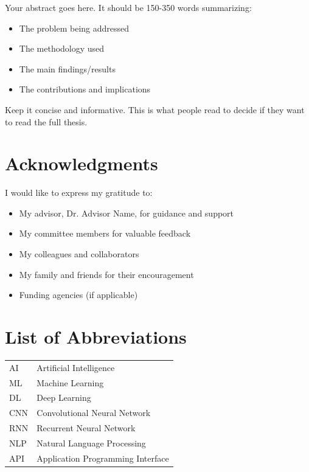 \documentclass[12pt,oneside]{book}
\theoremstyle{plain}
\theoremstyle{definition}
\begin{document}
\vspace{1cm}

\begin{singlespace}
Your abstract goes here. It should be 150-350 words summarizing:
\begin{itemize}
  \item The problem being addressed
  \item The methodology used
  \item The main findings/results
  \item The contributions and implications
\end{itemize}
Keep it concise and informative. This is what people read to decide if they want to read the full thesis.
\end{singlespace}

\clearpage

\chapter*{Acknowledgments}

I would like to express my gratitude to:

\begin{itemize}
  \item My advisor, Dr. Advisor Name, for guidance and support
  \item My committee members for valuable feedback
  \item My colleagues and collaborators
  \item My family and friends for their encouragement
  \item Funding agencies (if applicable)
\end{itemize}

\clearpage

\tableofcontents

\listoftables

\listoffigures

\listofalgorithms

\chapter*{List of Abbreviations}
\begin{tabular}{ll}
AI & Artificial Intelligence \\
ML & Machine Learning \\
DL & Deep Learning \\
CNN & Convolutional Neural Network \\
RNN & Recurrent Neural Network \\
NLP & Natural Language Processing \\
API & Application Programming Interface \\
\end{tabular}
\end{document}
